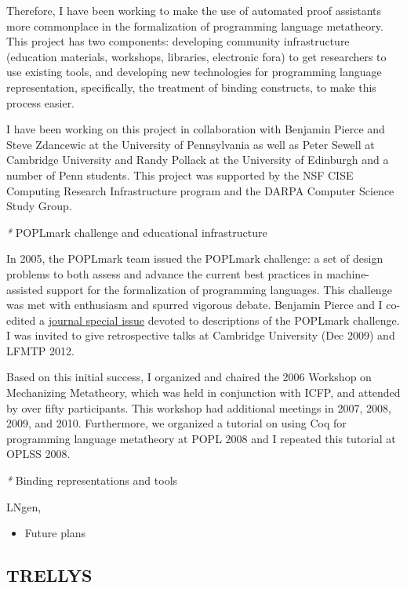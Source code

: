 \documentclass[]{article}
\begin{document}
Therefore, I have been working to make the use of automated proof
assistants more commonplace in the formalization of programming language
metatheory. This project has two components: developing community
infrastructure (education materials, workshops, libraries, electronic
fora) to get researchers to use existing tools, and developing new
technologies for programming language representation, specifically, the
treatment of binding constructs, to make this process easier.

I have been working on this project in collaboration with Benjamin
Pierce and Steve Zdancewic at the University of Pennsylvania as well as
Peter Sewell at Cambridge University and Randy Pollack at the University
of Edinburgh and a number of Penn students. This project was supported
by the NSF CISE Computing Research Infrastructure program and the DARPA
Computer Science Study Group.

\emph{*} POPLmark challenge and educational infrastructure

In 2005, the POPLmark team issued the POPLmark challenge: a set of
design problems to both assess and advance the current best practices in
machine-assisted support for the formalization of programming languages.
This challenge was met with enthusiasm and spurred vigorous debate.
Benjamin Pierce and I co-edited a \href{jar}{journal special issue}
devoted to descriptions of the POPLmark challenge. I was invited to give
retrospective talks at Cambridge University (Dec 2009) and LFMTP 2012.

Based on this initial success, I organized and chaired the 2006 Workshop
on Mechanizing Metatheory, which was held in conjunction with ICFP, and
attended by over fifty participants. This workshop had additional
meetings in 2007, 2008, 2009, and 2010. Furthermore, we organized a
tutorial on using Coq for programming language metatheory at POPL 2008
and I repeated this tutorial at OPLSS 2008.

\emph{*} Binding representations and tools

LNgen,

\begin{itemize}
\item
  Future plans
\end{itemize}

\subsection{TRELLYS}
\end{document}
